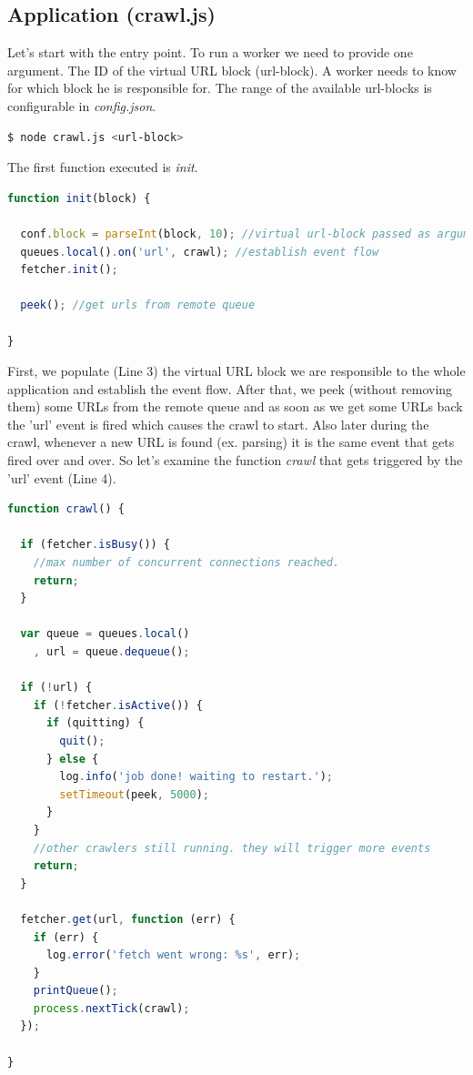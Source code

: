 \subsection{Application (crawl.js)}
Let's start with the entry point. To run a worker we need to provide one argument. The ID of the virtual URL block (url-block). A worker needs to know for which block he is responsible for. The range of the available url-blocks is configurable in \emph{config.json}.

\begin{lstlisting}[language=sh]
$ node crawl.js <url-block>
\end{lstlisting}

The first function executed is \emph{init}.

\begin{lstlisting}[language=JavaScript]
function init(block) {

  conf.block = parseInt(block, 10); //virtual url-block passed as argument on startup
  queues.local().on('url', crawl); //establish event flow
  fetcher.init();

  peek(); //get urls from remote queue

}
\end{lstlisting}

First, we populate (Line 3) the virtual URL block we are responsible to the whole application and establish the event flow. After that, we peek (without removing them) some URLs from the remote queue and as soon as we get some URLs back the 'url' event is fired which causes the crawl to start. Also later during the crawl, whenever a new URL is found (ex. parsing) it is the same event that gets fired over and over. So let's examine the function \emph{crawl} that gets triggered by the 'url' event (Line 4).

\begin{lstlisting}[language=JavaScript]
function crawl() {

  if (fetcher.isBusy()) {
    //max number of concurrent connections reached.
    return;
  }

  var queue = queues.local()
    , url = queue.dequeue();

  if (!url) {
    if (!fetcher.isActive()) {
      if (quitting) {
        quit();
      } else {
        log.info('job done! waiting to restart.');
        setTimeout(peek, 5000);
      }
    }
    //other crawlers still running. they will trigger more events
    return;
  }

  fetcher.get(url, function (err) {
    if (err) {
      log.error('fetch went wrong: %s', err);
    }
    printQueue();
    process.nextTick(crawl);
  });

}
\end{lstlisting}

